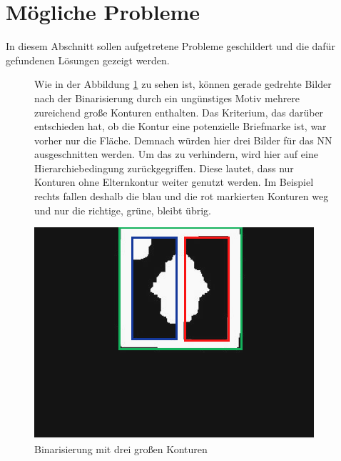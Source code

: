 \documentclass[12pt,toc=bib,toc=listof]{scrreprt}
\begin{document}
\section{Mögliche Probleme}
\label{sec_bv:probleme}
In diesem Abschnitt sollen aufgetretene Probleme geschildert und die dafür gefundenen Lösungen gezeigt werden.\\

\begin{figure}[h]
\begin{minipage}[t]{.75\linewidth}

Wie in der Abbildung \ref{fig:bv_prob1} zu sehen ist, können gerade gedrehte Bilder nach der Binarisierung durch ein ungünstiges Motiv mehrere zureichend große Konturen enthalten. Das Kriterium, das darüber entschieden hat, ob die Kontur eine potenzielle Briefmarke ist, war vorher nur die Fläche. Demnach würden hier drei Bilder für das NN ausgeschnitten werden. Um das zu verhindern, wird hier auf eine Hierarchiebedingung zurückgegriffen. Diese lautet, dass nur Konturen ohne Elternkontur weiter genutzt werden. Im Beispiel rechts fallen deshalb die blau und die rot markierten Konturen weg und nur die richtige, grüne, bleibt übrig.
\end{minipage}
\hfill
\begin{minipage}[t]{.2\linewidth}
\strut\vspace*{-\baselineskip}
\newline
  \includegraphics[width=\linewidth]{./bilder/prob1_bin}
  \caption{Binarisierung mit drei großen Konturen}
  \label{fig:bv_prob1}
\end{minipage}
\end{figure}
\end{document}
